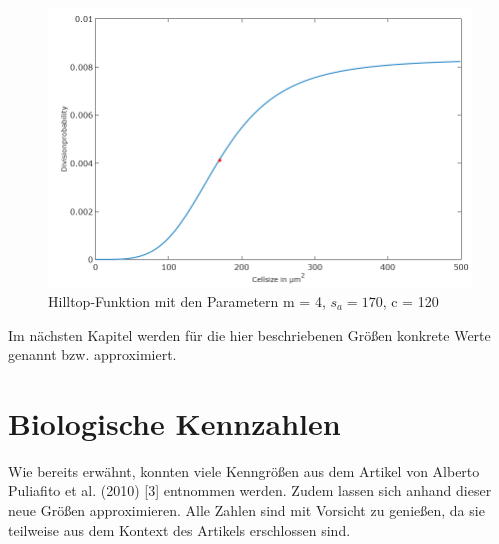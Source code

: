 \documentclass[11pt,a4paper,pointlessnumbers]{scrreprt}  %
\begin{document}
\begin{figure}[!ht]
	\centering
	\includegraphics{Hillfunc}
	\caption{Hilltop-Funktion mit den Parametern m = 4, $s_{a} = 170$, c = 120}
	\label{fig:Hillfunc}
\end{figure}

Im nächsten Kapitel werden für die hier beschriebenen Größen konkrete Werte genannt bzw. approximiert.

\chapter{Biologische Kennzahlen}\label{chp: Bio}
Wie bereits erwähnt, konnten viele Kenngrößen aus dem Artikel von Alberto Puliafito et al. (2010) [3] entnommen werden. Zudem lassen sich anhand dieser neue Größen approximieren. Alle Zahlen sind mit Vorsicht zu genießen, da sie teilweise aus dem Kontext des Artikels erschlossen sind.  
\end{document}
